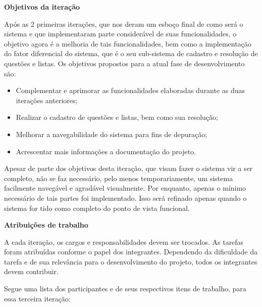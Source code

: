 \documentclass[12pt,letterpaper]{article}
\begin{document}
\vspace{1cm}
{\large {\bf Objetivos da iteração}}
\vspace{0.5cm}

Após as 2 primeiras iterações, que nos deram um esboço final de como será o sistema 
e que implementaram parte considerável de suas funcionalidades, o objetivo agora é a 
melhoria de tais funcionalidades, bem como a implementação do fator diferencial do 
sistema, que é o seu sub-sistema de cadastro e resolução de questões e listas.
Os objetivos propostos para a atual fase de desenvolvimento são:

\begin{itemize}
\item{} Complementar e aprimorar as funcionalidades elaboradas durante as duas iterações anteriores;
\item{} Realizar o cadastro de questões e listas, bem como sua resolução;
\item{} Melhorar a navegabilidade do sistema para fins de depuração;
\item{} Acrescentar mais informações a documentação do projeto.
\end{itemize}

Apesar de parte dos objetivos desta iteração, que visam fazer o sistema vir a ser 
completo, não se faz necessário, pelo menos temporariamente, um sistema facilmente 
navegável e agradável visualmente. Por enquanto, apenas o mínimo necessário de tais 
partes foi implementado. Isso será refinado apenas quando o sistema for tido como completo 
do ponto de vista funcional.





\vspace{1cm}
{\large {\bf Atribuições de trabalho}}
\vspace{0.5cm}

A cada iteração, os cargos e responsabilidades devem ser trocados. As tarefas foram atribuídas conforme o papel dos integrantes. Dependendo da dificuldade da tarefa e de sua relevância para o desenvolvimento do projeto, todos os integrantes devem contribuir.

Segue uma lista dos participantes e de seus respectivos itens de trabalho, para essa terceira iteração: 
\end{document}
